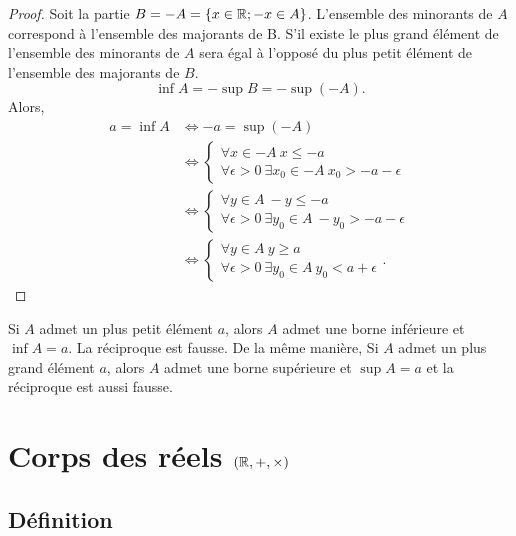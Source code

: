 \begin{proof}
  Soit la partie \(B = -A = \{x\in\mathbb{R}; -x\in A\}\). L'ensemble des minorants de
  \(A\) correspond à l'ensemble des majorants de B. S'il existe le plus grand
  élément de l'ensemble des minorants de \(A\) sera égal à l'opposé du plus
  petit élément de l'ensemble des majorants de \(B\).
  \begin{equation}
    \inf A = -\sup B = -\sup( - A).
  \end{equation}
  Alors,
  \begin{align}
    a = \inf A &\iff -a = \sup( - A)\\
               &\iff \begin{cases} \forall x \in -A \ x\leqslant -a \\ \forall
               \epsilon>0 \ \exists x_0 \in -A \ x_0> - a - \epsilon
             \end{cases}\\
               &\iff \begin{cases} \forall y \in A \ -y\leqslant -a \\ \forall
               \epsilon>0 \ \exists y_0 \in A \ -y_0> - a - \epsilon
             \end{cases}\\
               &\iff \begin{cases} \forall y \in A \ y\geqslant a \\ \forall
               \epsilon>0 \ \exists y_0 \in A \ y_0<a + \epsilon \end{cases}.
  \end{align}
\end{proof}

Si \(A\) admet un plus petit élément \(a\), alors \(A\) admet une borne
inférieure et \(\inf A = a\). La réciproque est fausse. De la même manière, Si
\(A\) admet un plus grand élément \(a\), alors \(A\) admet une borne supérieure
et \(\sup A = a\) et la réciproque est aussi fausse.

\section{Corps des réels \((\mathbb{R}, +, \times)\)}

\subsection{Définition}

